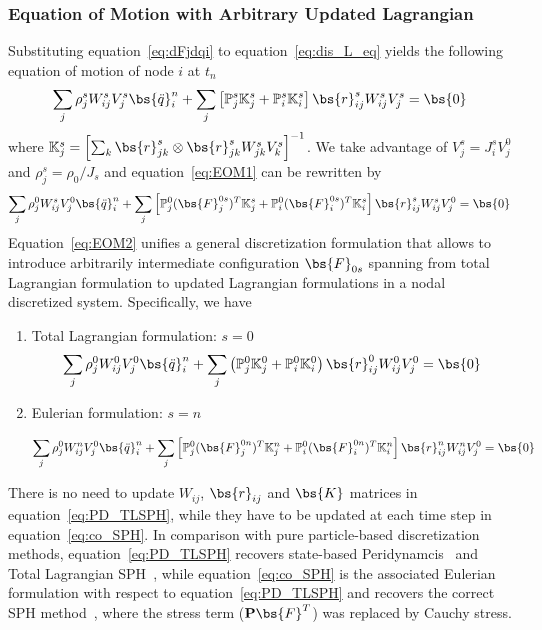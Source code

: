 \subsubsection{Equation of Motion with Arbitrary Updated Lagrangian}
Substituting equation~\eqref{eq:dFjdqi} to equation~\eqref{eq:dis_L_eq} yields the following equation of motion of node $i$ at $t_n$ 
\begin{equation}
\sum_j \rho_j^s  W_{ij}^s V_j^s\bs{\ddot{q}}_i^n+
\sum_j\left[\mathbb{P}_j^s\mathbb{K}_j^s+\mathbb{P}_i^s\mathbb{K}_i^s\right]\bs{r}_{ij}^s W_{ij}^s V_j^s=\bs{0}
\label{eq:EOM1}
\vspace{-3mm}
\end{equation}
where $\mathbb{K}_j^s=\left[\sum_{k}\bs{r}_{jk}^s\otimes \bs{r}_{jk}^s W_{jk}^s V_k^s \right]^{-1}$. We take advantage of $V_j^s=J_i^sV_j^0$ and $\rho_j^s=\rho_0/J_s$ and equation~\eqref{eq:EOM1} can be rewritten by
\begin{eqnarray}
\sum_j \rho_j^0  W_{ij}^s V_j^0\bs{\ddot{q}}_i^n+
\sum_j\left[\mathbb{P}_j^0(\bs{F}_j^{0s})^T\mathbb{K}_j^s+\mathbb{P}_i^0(\bs{F}_i^{0s})^T\mathbb{K}_i^s\right]\bs{r}_{ij}^s W_{ij}^s V_j^0=\bs{0}
\label{eq:EOM2}
\vspace{-3mm}
\end{eqnarray}
Equation~\eqref{eq:EOM2} unifies a general discretization formulation that allows to introduce arbitrarily intermediate configuration $\bs{F}_{0s}$ spanning from total Lagrangian formulation to updated Lagrangian formulations in a nodal discretized system. 
Specifically, we have
\begin{enumerate}
    \item Total Lagrangian formulation: $s=0$ 
\begin{eqnarray}
\sum_j \rho_j^0  W_{ij}^0 V_j^0\bs{\ddot{q}}_i^n+
\sum_j\left(\mathbb{P}_j^0\mathbb{K}_j^0+\mathbb{P}_i^0\mathbb{K}_i^0\right)\bs{r}_{ij}^0W_{ij}^0 V_j^0=\bs{0}
\label{eq:PD_TLSPH}
\end{eqnarray}

\item Eulerian formulation: $s=n$ 

\begin{eqnarray}
\sum_j \rho_j^0  W_{ij}^n V_j^0\bs{\ddot{q}}_i^n+
\sum_j\left[\mathbb{P}_j^0(\bs{F}_j^{0n})^T\mathbb{K}_j^n+\mathbb{P}_i^0(\bs{F}_i^{0n})^T\mathbb{K}_i^n\right]\bs{r}_{ij}^n W_{ij}^n V_j^0=\bs{0}
\label{eq:co_SPH}
\end{eqnarray}
\end{enumerate}
There is no need to update $W_{ij}$, $\bs{r}_{ij}$ and $\bs{K}$ matrices in equation~\eqref{eq:PD_TLSPH}, while they have to be updated at each time step in equation~\eqref{eq:co_SPH}. In comparison with pure particle-based discretization methods, equation~\eqref{eq:PD_TLSPH} recovers state-based Peridynamcis~\cite{Javili:2019:PD, Xue:2018:PD} and Total Lagrangian SPH~\cite{Ganzenmuller:2015:Similarity}, while equation~\eqref{eq:co_SPH} is the associated Eulerian formulation with respect to equation~\eqref{eq:PD_TLSPH} and recovers the correct SPH method~\cite{Vidal:2007:Stabilized}, where the stress term ($\mathbf{P}\bs{F}^T$) was replaced by Cauchy stress. 
